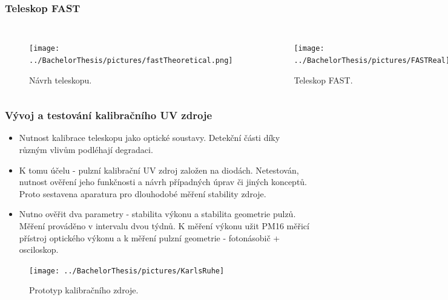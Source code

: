 \documentclass{beamer}
\begin{document}
\begin{frame}
\frametitle{Teleskop FAST}
\begin{columns}[t]
\centering
\begin{figure}[H]
\texttt{[image: ../BachelorThesis/pictures/fastTheoretical.png]}\\
\caption{Návrh teleskopu.}
\end{figure}
\centering
\begin{figure}[H]
\texttt{[image: ../BachelorThesis/pictures/FASTReal]}\\
\caption{Teleskop FAST.}
\end{figure}
\end{columns}



\end{frame}



\begin{frame}
\frametitle{Vývoj a testování kalibračního UV zdroje}
\begin{itemize}
 \item Nutnost kalibrace teleskopu jako optické soustavy. Detekční části díky různým vlivům podléhají degradaci.
 \item K tomu účelu - pulzní kalibrační UV zdroj založen na diodách. Netestován, nutnost ověření jeho funkčnosti a návrh případných úprav či jiných konceptů. Proto sestavena aparatura pro dlouhodobé měření stability zdroje.
 \item Nutno ověřit dva parametry - stabilita výkonu a stabilita geometrie pulzů. Měření prováděno v intervalu dvou týdnů. K měření výkonu užit PM16 měřicí přístroj optického výkonu a k měření pulzní geometrie - fotonásobič + osciloskop.
\end{itemize}





\end{frame}

\begin{frame}


 \begin{figure}[H]
 \centering
 \texttt{[image: ../BachelorThesis/pictures/KarlsRuhe]}
 \caption{Prototyp kalibračního zdroje.}
 \label{UVsource}
\end{figure}


\end{frame}
\end{document}
